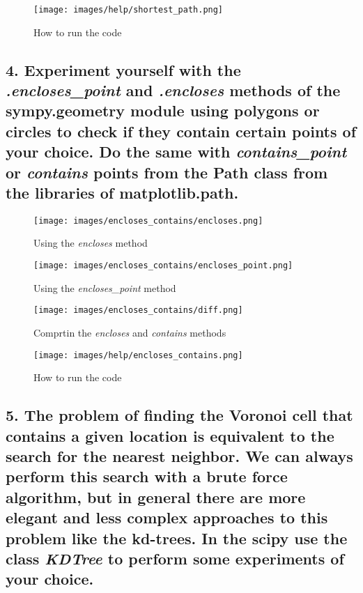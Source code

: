 \documentclass[12pt]{article}
\newenvironment{matlab}
	{\begin{figure}[H]\centering\captionsetup{justification=centering}}
	{\end{figure}}
\begin{document}
\begin{matlab}
    \texttt{[image: images/help/shortest\_path.png]}
    \caption{How to run the code}
\end{matlab}

\pagebreak

\subsection*{4. Experiment yourself with the \textit{.encloses\_point} and \textit{.encloses} methods of the
    \textbf{sympy.geometry} module using polygons or circles to check if they contain certain points of
    your choice. Do the same with \textit{contains\_point} or \textit{contains} points from the Path class from the
    libraries of \textbf{matplotlib.path}.}

\begin{matlab}
    \texttt{[image: images/encloses\_contains/encloses.png]}
    \caption{Using the \textit{encloses} method}
\end{matlab}

\begin{matlab}
    \texttt{[image: images/encloses\_contains/encloses\_point.png]}
    \caption{Using the \textit{encloses\_point} method}
\end{matlab}

\begin{matlab}
    \texttt{[image: images/encloses\_contains/diff.png]}
    \caption{Comprtin the \textit{encloses} and \textit{contains} methods}
\end{matlab}

\begin{matlab}
    \texttt{[image: images/help/encloses\_contains.png]}
    \caption{How to run the code}
\end{matlab}

\pagebreak

\subsection*{5. The problem of finding the Voronoi cell that contains a given location is
    equivalent to the search for the nearest neighbor. We can always perform this search with a
    brute force algorithm, but in general there are more elegant and less complex approaches to
    this problem like the kd-trees. In the \textbf{scipy} use the class \textit{KDTree} to perform some experiments
    of your choice.}
\end{document}
